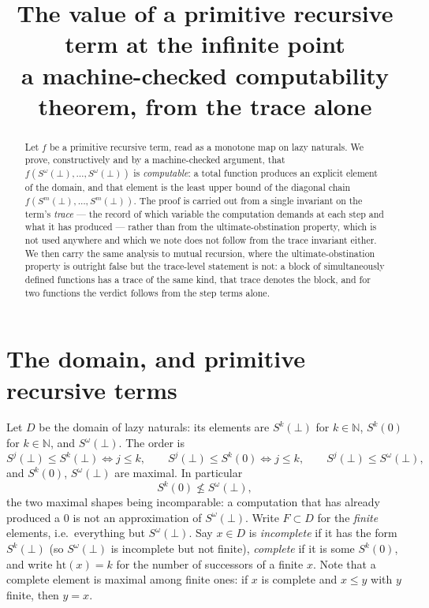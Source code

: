 \documentclass[11pt]{article}
\title{The value of a primitive recursive term at the infinite point\\
{\large a machine-checked computability theorem, from the trace alone}}
\author{}
\date{}
\newcommand{\Sw}{S^{\omega}(\bot)}
\newcommand{\N}{\mathbb{N}}
\newcommand{\D}{D}
\newcommand{\Fin}{F}
\newcommand{\hgt}{\mathrm{ht}}
\theoremstyle{definition}
\begin{document}
\maketitle

\begin{abstract}
Let $f$ be a primitive recursive term, read as a monotone map on lazy
naturals. We prove, constructively and by a machine-checked argument, that
$f(\Sw,\dots,\Sw)$ is \emph{computable}: a total function produces an
explicit element of the domain, and that element is the least upper bound
of the diagonal chain $f(S^m(\bot),\dots,S^m(\bot))$. The proof is carried
out from a single invariant on the term's \emph{trace} --- the record of
which variable the computation demands at each step and what it has
produced --- rather than from the ultimate-obstination property, which is
not used anywhere and which we note does not follow from the trace
invariant either. We then carry the same analysis to mutual recursion,
where the ultimate-obstination property is outright false but the
trace-level statement is not: a block of simultaneously defined functions
has a trace of the same kind, that trace denotes the block, and for two
functions the verdict follows from the step terms alone.
\end{abstract}

\section{The domain, and primitive recursive terms}

Let $\D$ be the domain of lazy naturals: its elements are
$S^k(\bot)$ for $k \in \N$, $S^k(0)$ for $k \in \N$, and $\Sw$. The order
is
\[
S^j(\bot) \le S^k(\bot) \iff j \le k, \qquad
S^j(\bot) \le S^k(0) \iff j \le k, \qquad
S^j(\bot) \le \Sw ,
\]
and $S^k(0)$, $\Sw$ are maximal. In particular
\begin{equation}
\label{eq:incomp}
S^k(0) \not\le \Sw ,
\end{equation}
the two maximal shapes being incomparable: a computation that has already
produced a $0$ is not an approximation of $\Sw$. Write $\Fin \subset \D$
for the \emph{finite} elements, i.e.\ everything but $\Sw$. Say $x \in \D$
is \emph{incomplete} if it has the form $S^k(\bot)$ (so $\Sw$ is
incomplete but not finite), \emph{complete} if it is some $S^k(0)$, and
write $\hgt(x) = k$ for the number of successors of a finite $x$. Note that
a complete element is maximal among finite ones: if $x$ is complete and
$x \le y$ with $y$ finite, then $y = x$.
\end{document}

